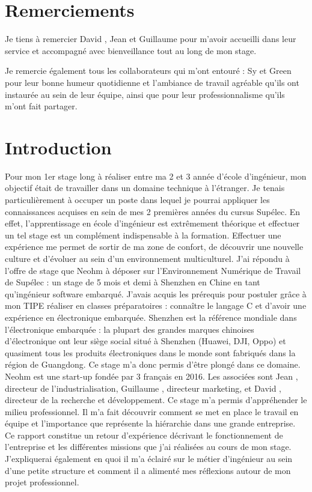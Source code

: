 \documentclass[a4paper, 12pt]{report}
\begin{document}
\renewcommand{\contentsname}{Sommaire} %

\tableofcontents

\chapter*{Remerciements}

Je tiens à remercier David , Jean  et Guillaume  pour m’avoir accueilli dans leur service et accompagné avec bienveillance tout au long de mon stage.

Je remercie également tous les collaborateurs qui m’ont entouré : Sy et Green pour leur bonne humeur quotidienne et l’ambiance de travail agréable qu’ils ont instaurée au sein de leur équipe, ainsi que pour leur professionnalisme qu’ils m’ont fait partager.

\chapter{Introduction}
Pour mon 1er stage long à réaliser entre ma 2\ieme{} et 3\ieme{} année d’école d’ingénieur, mon objectif était de travailler dans un domaine technique à l’étranger. Je tenais particulièrement à occuper un poste dans lequel je pourrai appliquer les connaissances acquises en sein de mes 2 premières années du cursus Supélec. En effet, l’apprentissage en école d’ingénieur est extrêmement théorique et effectuer un tel stage est un complément indispensable à la formation. Effectuer une expérience me permet de sortir de ma zone de confort, de découvrir une nouvelle culture et d’évoluer au sein d’un environnement multiculturel. 
J’ai répondu à l’offre de stage que Neohm à déposer sur l’Environnement Numérique de Travail de Supélec : un stage de 5 mois et demi à Shenzhen en Chine en tant qu’ingénieur software embarqué. J’avais acquis les prérequis pour postuler grâce à mon TIPE réaliser en classes préparatoires : connaître le langage C et d’avoir une expérience en électronique embarquée.
Shenzhen est la référence mondiale dans l’électronique embarquée : la plupart des grandes marques chinoises d’électronique ont leur siège social situé à Shenzhen (Huawei, DJI, Oppo) et quasiment tous les produits électroniques dans le monde sont fabriqués dans la région de Guangdong. Ce stage m’a donc permis d’être plongé dans ce domaine.
Neohm est une start-up fondée par 3 français en 2016. Les associées sont Jean , directeur de l’industrialisation, Guillaume , directeur marketing, et David , directeur de la recherche et développement. 
Ce stage m’a permis d’appréhender le milieu professionnel. Il m’a fait découvrir comment se met en place le travail en équipe et l’importance que représente la hiérarchie dans une grande entreprise.
Ce rapport constitue un retour d’expérience décrivant le fonctionnement de l’entreprise et les différentes missions que j’ai réalisées au cours de mon stage. J’expliquerai également en quoi il m’a éclairé sur le métier d’ingénieur au sein d’une petite structure et comment il a alimenté mes réflexions autour de mon projet professionnel.
\end{document}
